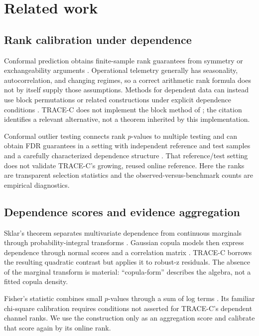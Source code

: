 \section{Related work}

\subsection{Rank calibration under dependence}

Conformal prediction obtains finite-sample rank guarantees from symmetry or
exchangeability arguments \citep{shafer2008tutorial}. Operational telemetry
generally has seasonality, autocorrelation, and changing regimes, so a correct
arithmetic rank formula does not by itself supply those assumptions. Methods
for dependent data can instead use block permutations or related constructions
under explicit dependence conditions \citep{chernozhukov2018dependentconformal}.
TRACE-C does not implement the block method of
\citet{chernozhukov2018dependentconformal}; the citation identifies a relevant
alternative, not a theorem inherited by this implementation.

Conformal outlier testing connects rank $p$-values to multiple testing and can
obtain FDR guarantees in a setting with independent reference and test samples
and a carefully characterized dependence structure \citep{bates2023conformaloutliers}.
That reference/test setting does not validate TRACE-C's growing, reused online
reference. Here the ranks are transparent selection statistics and the
observed-versus-benchmark counts are empirical diagnostics.

\subsection{Dependence scores and evidence aggregation}

Sklar's theorem separates multivariate dependence from continuous marginals
through probability-integral transforms \citep{sklar1959fonctions}. Gaussian
copula models then express dependence through normal scores and a correlation
matrix \citep{song2000gaussiancopula}. TRACE-C borrows the resulting quadratic
contrast but applies it to robust-z residuals. The absence of the marginal
transform is material: ``copula-form'' describes the algebra, not a fitted
copula density.

Fisher's statistic combines small $p$-values through a sum of log terms
\citep{fisher1932statisticalmethods}. Its familiar chi-square calibration
requires conditions not asserted for TRACE-C's dependent channel ranks. We use
the construction only as an aggregation score and calibrate that score again
by its online rank.

